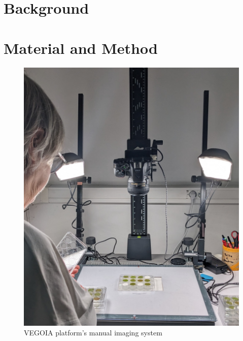 \documentclass[english]{article}
\begin{document}

\begin{abstract}

\end{abstract}

\section{Background}

\section{Material and Method}

\begin{figure}[H]
    \begin{center}
        \includegraphics[width=0.5\linewidth]{2023_a_oiv_imaging_system.jpg}
        \caption{VEGOIA platform's manual imaging system}\label{fig:vegoia}
    \end{center}
\end{figure}
\end{document}
